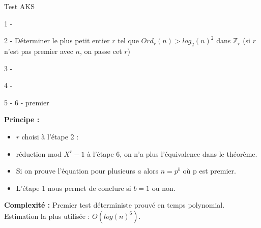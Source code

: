 			\begin{frame}
			\begin{algorithm}[H]
				\caption{Test AKS}\label{AKS}
				
				1 - 
				
				2 - Déterminer le plus petit entier $r$ tel que $Ord_{r}(n) > log_{2}(n)^{2}$ dans $\mathbb{Z}_{r}$ (si $r$ n'est pas premier avec $n$, on passe cet $r$)\;
				
				3 - 
				
				4 - 
				
				5 - 
				6 - \Retour premier\;
			\end{algorithm}
			\end{frame}
			
			\begin{frame}
				\textbf{Principe :}
				\begin{itemize}
				\item $r$ choisi à l'étape 2 :
				\item réduction mod $X^{r} - 1$ à l'étape 6, on n'a plus l'équivalence dans le théorème.
				\item Si on prouve l'équation pour plusieurs $a$ alors $n = p^{b}$ où p est premier. 
				\item L'étape 1 nous permet de conclure si $b = 1$ ou non.
				\end{itemize}
				\textbf{Complexité :} Premier test déterministe prouvé en temps polynomial. Estimation la plus utilisée : $O(log(n)^{6})$.
			\end{frame}	
		
